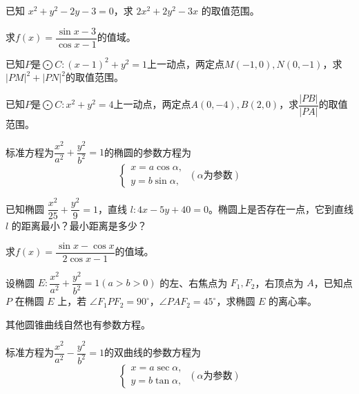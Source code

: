 \begin{example}
    已知 \(x^2 + y^2 - 2y - 3 = 0\)，求 \(2x^2 + 2y^2 - 3x\) 的取值范围。
\end{example}

\begin{example}
    求\(f(x)=\dfrac{\sin x-3}{\cos x -1}\)的值域。
\end{example}

\begin{example}
    已知\(P\)是\(\bigodot C:(x-1)^2+y^2=1\)上一动点，两定点\(M(-1,0), N(0,-1)\)，求\(|PM|^2+|PN|^2\)的取值范围。
\end{example}
\begin{exercise}
    已知\(P\)是\(\bigodot C:x^2+y^2=4\)上一动点，两定点\(A(0,-4), B(2,0)\)，求\(\dfrac{|PB|}{|PA|}\)的取值范围。
\end{exercise}
\begin{theorem}[椭圆的参数方程]
标准方程为\(\dfrac{x^2}{a^2}+\dfrac{y^2}{b^2}=1\)的椭圆的参数方程为
    \[\left\{
    \begin{gathered}
        x = a \cos \alpha, \\
        y = b \sin \alpha,
    \end{gathered}\right.
    \ (\alpha\text{为参数})
    \]
\end{theorem}
\begin{corollary}[椭圆参数方程中参数的几何意义]
    
\end{corollary}
\begin{example}
    已知椭圆 \(\dfrac{x^2}{25} + \dfrac{y^2}{9} = 1\)，直线 \(l: 4x - 5y + 40 = 0\)。椭圆上是否存在一点，它到直线 \(l\) 的距离最小？最小距离是多少？
\end{example}


\begin{exercise}
    求\(f(x)=\dfrac{\sin x-\cos x}{2\cos x -1}\)的值域。
\end{exercise}

\begin{example}
    设椭圆 \(E: \dfrac{x^2}{a^2} + \dfrac{y^2}{b^2} = 1 (a > b > 0)\) 的左、右焦点为 \(F_1, F_2\)，右顶点为 \(A\)，已知点 \(P\) 在椭圆 \(E\) 上，若 \(\angle F_1PF_2 = 90^\circ\)，\(\angle PAF_2 = 45^\circ\)，求椭圆 \(E\) 的离心率。
\end{example}
\begin{example}
    
\end{example}
其他圆锥曲线自然也有参数方程。
\begin{theorem}[双曲线的参数方程]
标准方程为\(\dfrac{x^2}{a^2}-\dfrac{y^2}{b^2}=1\)的双曲线的参数方程为
    \[\left\{
    \begin{gathered}
        x = a \sec \alpha, \\
        y = b \tan \alpha,
    \end{gathered}\right.
    \ (\alpha\text{为参数})
    \]
\end{theorem}

